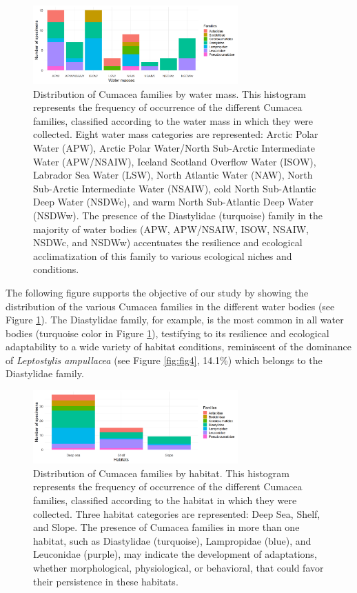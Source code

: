 {\begin{figure}[htbp]
    \centering
    \includegraphics[width=0.7\textwidth]{figure3.png}
    \caption{Distribution of Cumacea families by water mass. This histogram represents the frequency of occurrence of the different Cumacea families, classified according to the water mass in which they were collected. Eight water mass categories are represented: Arctic Polar Water (APW), Arctic Polar Water/North Sub-Arctic Intermediate Water (APW/NSAIW), Iceland Scotland Overflow Water (ISOW), Labrador Sea Water (LSW), North Atlantic Water (NAW), North Sub-Arctic Intermediate Water (NSAIW), cold North Sub-Atlantic Deep Water (NSDWc), and warm North Sub-Atlantic Deep Water (NSDWw). The presence of the Diastylidae (turquoise) family in the majority of water bodies (APW, APW/NSAIW, ISOW, NSAIW, NSDWc, and NSDWw) accentuates the resilience and ecological acclimatization of this family to various ecological niches and conditions. \label{fig:fig5}}
\end{figure}

The following figure supports the objective of our study by showing the distribution of the various Cumacea families in the different water bodies (see Figure \ref{fig:fig5}). The Diastylidae family, for example, is the most common in all water bodies (turquoise color in Figure \ref{fig:fig5}), testifying to its resilience and ecological adaptability to a wide variety of habitat conditions, reminiscent of the dominance of \emph{Leptostylis ampullacea} (see Figure \ref{fig:fig4}, 14.1\%) which belongs to the Diastylidae family.

\begin{figure}[]
    \centering
    \includegraphics[width=0.7\textwidth]{figure4.png}
    \caption{Distribution of Cumacea families by habitat. This histogram represents the frequency of occurrence of the different Cumacea families, classified according to the habitat in which they were collected. Three habitat categories are represented: Deep Sea, Shelf, and Slope. The presence of Cumacea families in more than one habitat, such as Diastylidae (turquoise), Lampropidae (blue), and Leuconidae (purple), may indicate the development of adaptations, whether morphological, physiological, or behavioral, that could favor their persistence in these habitats. \label{fig:fig6}}
\end{figure}

}
